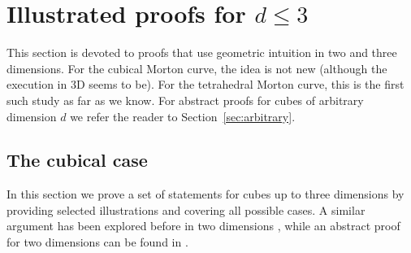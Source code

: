 \documentclass[a4paper,11pt]{article}
\newcommand{\seclab}[1]{\label{sec:#1}}
\newcommand{\secref}[1]{Section~\ref{sec:#1}}
\begin{document}
\section{Illustrated proofs for $d \le 3$}
\seclab{illustrated}

This section is devoted to proofs that use geometric intuition in two and
three dimensions.
For the cubical Morton curve, the idea is not new (although the execution in 3D
seems to be).
For the tetrahedral Morton curve, this is the first such study as far as we
know.
For abstract proofs for cubes of arbitrary dimension $d$ we refer the reader to
\secref{arbitrary}.


\subsection{The cubical case}
\seclab{illustrated-cubical}

In this section we prove a set of statements for cubes up to three dimensions
by providing selected illustrations and covering all possible cases.
A similar argument has been explored before in two dimensions \cite{Bader12},
while an abstract proof for two dimensions can be found in
\cite{deBergHaverkortThiteEtAl10}.
\end{document}
